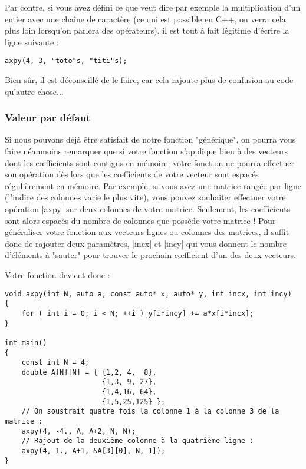 \begin{itemize}
Par contre, si vous avez défini ce que veut dire par exemple la multiplication d'un entier
avec une chaîne de caractère (ce qui est possible en C++, on verra cela plus loin lorsqu'on parlera des opérateurs), il est tout à fait légitime d'écrire la ligne suivante :
\begin{lstlisting}
axpy(4, 3, "toto"s, "titi"s);
\end{lstlisting}

Bien sûr, il est déconseillé de le faire, car cela rajoute plus de confusion au code qu'autre chose...

\subsubsection{Valeur par défaut}

Si nous pouvons déjà être satisfait de notre fonction "générique", on pourra vous faire
néanmoins remarquer que si votre fonction s'applique bien à des vecteurs dont les c{\oe}fficients sont contigüs en mémoire, votre fonction ne pourra effectuer son opération dès lors que les c{\oe}fficients de votre vecteur sont espacés régulièrement en mémoire. Par exemple, si vous avez une matrice rangée par ligne (l'indice des colonnes varie le plus vite), vous pouvez souhaiter effectuer votre opération |axpy| sur deux colonnes de votre matrice. Seulement, les coefficients sont alors espacés du nombre de colonnes que possède votre matrice ! Pour généraliser votre fonction aux vecteurs lignes ou colonnes des matrices, il suffit donc de rajouter deux paramètres, |incx| et |incy| qui vous donnent le nombre d'éléments à "sauter" pour trouver le prochain c{\oe}fficient d'un des deux vecteurs.

Votre fonction devient donc :

\begin{lstlisting}[caption=Généralisation de la fonction axpy]
void axpy(int N, auto a, const auto* x, auto* y, int incx, int incy)
{
    for ( int i = 0; i < N; ++i ) y[i*incy] += a*x[i*incx];
}

int main()
{
    const int N = 4;
    double A[N][N] = { {1,2, 4,  8}, 
                       {1,3, 9, 27},
                       {1,4,16, 64},
                       {1,5,25,125} };
    // On soustrait quatre fois la colonne 1 à la colonne 3 de la matrice :
    axpy(4, -4., A, A+2, N, N);
    // Rajout de la deuxième colonne à la quatrième ligne :
    axpy(4, 1., A+1, &A[3][0], N, 1]);
}
\end{lstlisting}


\end{itemize}
